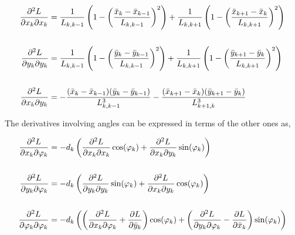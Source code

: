 \begin{align}
\frac{\partial^2 L}{\partial x_{k} \partial x_{k}} &= \frac{1}{L_{k,k-1}}\left( 1 - \left(\frac{\bar{x}_{k} - \bar{x}_{k-1}}{L_{k,k-1}}\right)^2 \right) + \frac{1}{L_{k,k+1}}\left( 1 - \left(\frac{\bar{x}_{k+1} - \bar{x}_{k}}{L_{k,k+1}}\right)^2 \right) \\
\notag \\
\frac{\partial^2 L}{\partial y_{k} \partial y_{k}} &= \frac{1}{L_{k,k-1}}\left( 1 - \left(\frac{\bar{y}_{k} - \bar{y}_{k-1}}{L_{k,k-1}}\right)^2 \right) + \frac{1}{L_{k,k+1}}\left( 1 - \left(\frac{\bar{y}_{k+1} - \bar{y}_{k}}{L_{k,k+1}}\right)^2 \right) \\
\notag \\
\frac{\partial^2 L}{\partial x_{k} \partial y_{k}} &= -\frac{(\bar{x}_{k} - \bar{x}_{k-1})(\bar{y}_{k} - \bar{y}_{k-1})}{L_{k,k-1}^3} - \frac{(\bar{x}_{k+1} - \bar{x}_{k})(\bar{y}_{k+1} - \bar{y}_{k})}{L_{k+1,k}^3}
\end{align}

The derivatives involving angles can be expressed in terms of the other ones as,

\begin{align}
\frac{\partial^2 L}{\partial x_{k} \partial \varphi_{k}} &= -d_{k}\left( \frac{\partial^2 L}{\partial x_{k} \partial x_{k}}\cos(\varphi_{k}) + \frac{\partial^2 L}{\partial x_{k} \partial y_{k}}\sin(\varphi_{k})\right) \\
\notag \\
\frac{\partial^2 L}{\partial y_{k} \partial \varphi_{k}} &= -d_{k}\left( \frac{\partial^2 L}{\partial y_{k} \partial y_{k}}\sin(\varphi_{k}) + \frac{\partial^2 L}{\partial x_{k} \partial y_{k}}\cos(\varphi_{k})\right) \\
\notag \\
\frac{\partial^2 L}{\partial \varphi_{k} \partial \varphi_{k}} &= -d_{k}\left(\left(\frac{\partial^2 L}{\partial x_{k} \partial \varphi_{k}} + \frac{\partial L}{\partial \bar{y}_{k}}\right)\cos(\varphi_{k}) + \left(\frac{\partial^2 L}{\partial y_{k} \partial \varphi_{k}} - \frac{\partial L}{\partial \bar{x}_{k}}\right)\sin(\varphi_{k})\right)
\end{align}



